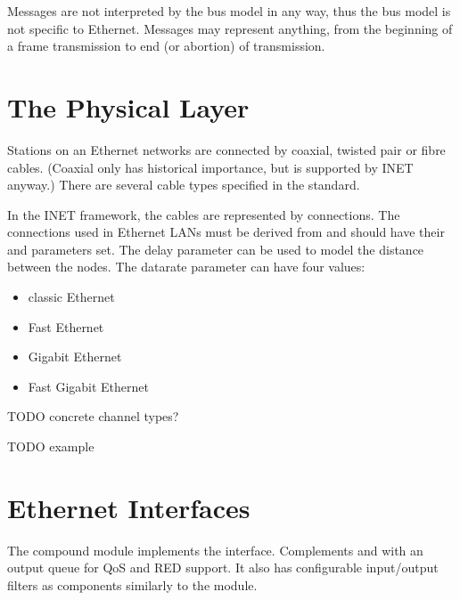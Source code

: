 Messages are not interpreted by the bus model in any way, thus the bus
model is not specific to Ethernet. Messages may represent anything, 
from the beginning of a frame transmission to end (or abortion) of transmission.




\section{The Physical Layer}

Stations on an Ethernet networks are connected by coaxial,
twisted pair or fibre cables. (Coaxial only has historical importance,
but is supported by INET anyway.) There are several cable types specified
in the standard.

In the INET framework, the cables are represented by connections.
The connections used in Ethernet LANs must be derived from
 and should have their  and
 parameters set.
The delay parameter can be used to model the distance between the
nodes. The datarate parameter can have four values:

\begin{itemize}
  \item {} classic Ethernet
  \item {} Fast Ethernet
  \item {} Gigabit Ethernet
  \item {} Fast Gigabit Ethernet
\end{itemize}

TODO concrete channel types?

TODO example

\section{Ethernet Interfaces}

The  compound module implements the 
interface. Complements  and  with an output queue
for QoS and RED support. It also has configurable input/output filters as 
components similarly to the  module.

